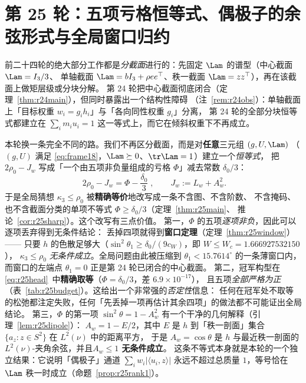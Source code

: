 \section{第 25 轮：五项亏格恒等式、偶极子的余弦形式与全局窗口归约}\label{sec:r25}

前二十四轮的绝大部分工作都是\emph{分截面}进行的：先固定 $\Lam$ 的谱型（中心截面 $\Lam=I_3/3$、
单轴截面 $\Lam=bI_3+\rho ee^\top$、秩一截面 $\Lam=zz^\top$），再在该截面上做矩层级或分块分解。
第 24 轮把中心截面彻底闭合（定理~\ref{thm:r24main}），但同时暴露出一个结构性障碍
（注~\ref{rem:r24obs}）：单轴截面上「目标权重 $w_i=g_ih_i$」与「各向同性权重 $g_i$」分离，
第 24 轮的全部分块恒等式都建立在 $\sum_im_iu_i=1$ 这一等式上，而它在倾斜权重下不再成立。

本轮换一条完全不同的路。我们不再区分截面，而是对\textbf{任意}三元组 $(g,U,\Lam)$
（$(g,U)$ 满足 \eqref{eq:frame18}，$\Lam\succeq0$、$\tr\Lam=1$）建立一个\emph{恒等式}，
把 $2\rho_0-J_w$ 写成「一个由五项非负量组成的亏格 $\Phi$」减去常数 $\delta_0/3$：
\begin{equation}\label{eq:r25head}
\boxed{\;2\rho_0-J_w=\Phi-\frac{\delta_0}{3}\;},\qquad
J_w:=L_w+A_w^2 .
\end{equation}
于是全局猜想 $\kappa_3\le\rho_0$ 被\textbf{精确等价}地改写成一条不含图、不含阶数、
不含掩码、也不含截面分类的单项不等式 $\Phi\ge\delta_0/3$（定理~\ref{thm:r25main}、
推论~\ref{cor:r25sharp}）。这个改写有三点价值。
第一，$\Phi$ 的五项\emph{逐项非负}，因此可以逐项丢弃得到无条件结论：
丢掉四项就得到\textbf{窗口定理}（定理~\ref{thm:r25window}）——
只要 $h$ 的色散足够大（$\sin^2\theta_1\ge\delta_0/(9c_W)$，即 $W\le W_c=1.666927532150$），
$\kappa_3\le\rho_0$ \emph{无条件成立}。全局问题由此被压缩到
$\theta_1<15.7614^\circ$ 的一条薄窗口内，而窗口的左端点 $\theta_1=0$ 正是第 24 轮已闭合的中心截面。
第二，冠军构型在 \eqref{eq:r25head}~中\textbf{精确取等}（$\Phi=\delta_0/3$，差 $6.9\times10^{-17}$），
且五项\emph{全部严格为正}（表~\ref{tab:r25budget}）。这给出一个非常强的\emph{否定性}信息：
任何在冠军处不取等的松弛都注定失败，任何「先丢掉一项再估计其余四项」的做法都不可能证出全局结论。
第三，$\Phi$ 的第一项 $\sin^2\theta=1-A_w^2$ 有一个干净的几何解释（引理~\ref{lem:r25dipole}）：
$A_w=1-E/2$，其中 $E$ 是 $h$ 到「秩一剖面」集合 $\{a_z:z\in S^2\}$ 在 $L^2(\nu)$ 中的距离平方，
于是 $A_w=\cos\theta$ 是 $h$ 与最近秩一剖面的 $L^2(\nu)$-夹角余弦，并且\textbf{$A_w\le1$ 无条件成立}。
这条不等式本身就是本轮的一个独立结果：它说明「偶极子」通道
$\sum_iw_i|\langle u_i,z\rangle|$ 永远不超过总质量 $1$，等号恰在 $\Lam$ 秩一时成立（命题~\ref{prop:r25rank1}）。

